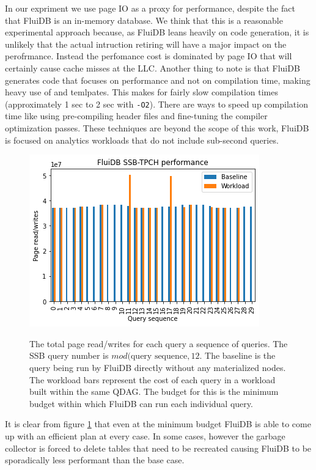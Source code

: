 In our expriment we use page IO as a proxy for performance, despite
the fact that FluiDB is an in-memory database. We think that this is a
reasonable experimental approach because, as FluiDB leans heavily on
code generation, it is unlikely that the actual intruction retiring
will have a major impact on the perofrmance. Instead the perfomance
cost is dominated by page IO that will certainly cause cache misses at
the LLC. Another thing to note is that FluiDB generates code that
focuses on performance and not on compilation time, making heavy use
of  and temlpates.  This makes for fairly slow compilation
times (approximately 1 sec to 2 sec with \texttt{-O2}). There are ways to
speed up compilation time like using pre-compiling header files
\cite{PrecompiledHeadersPCH} and fine-tuning the compiler optimization
passes. These techniques are beyond the scope of this work, FluiDB is
focused on analytics workloads that do not include sub-second queries.

\begin{figure}[p]
\centering
\includegraphics[width=.9\linewidth]{./imgs/2021-12-03_18-36-27_screenshot.png}
\label{fig:min_budget_plot}
\caption{The total page read/writes for each query a sequence of
  queries. The SSB query number is \(mod(\text{query
    sequence},12\). The baseline is the query being run by FluiDB
  directly without any materialized nodes. The workload bars represent
  the cost of each query in a workload built within the same QDAG. The
  budget for this is the minimum budget within which FluiDB can run
  each individual query.}
\end{figure}

It is clear from figure \ref{fig:min_budget_plot} that even at the minimum budget
FluiDB is able to come up with an efficient plan at every case. In
some cases, however the garbage collector is forced to delete tables
that need to be recreated causing FluiDB to be sporadically less
performant than the base case.

